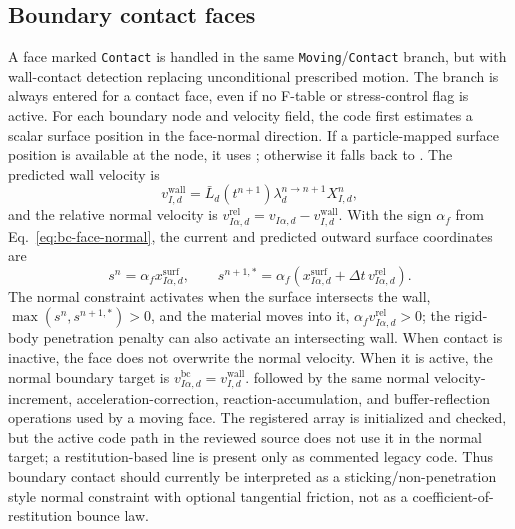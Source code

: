 \subsection{Boundary contact faces}
\label{subsec:bc-contact-wall}

A face marked \texttt{Contact} is handled in the same \texttt{Moving}/\texttt{Contact} branch, but with wall-contact detection replacing unconditional prescribed motion.  The branch is always entered for a contact face, even if no F-table or stress-control flag is active.  For each boundary node and velocity field, the code first estimates a scalar surface position in the face-normal direction.  If a particle-mapped surface position is available at the node, it uses ; otherwise it falls back to .  The predicted wall velocity is
\begin{equation}
  v_{I,d}^{\mathrm{wall}} = \bar L_d(t^{n+1})\lambda_d^{n\rightarrow n+1}X_{I,d}^{n},
  \label{eq:bc-wall-normal-target}
\end{equation}
and the relative normal velocity is $v_{I\alpha,d}^{\mathrm{rel}}=v_{I\alpha,d}-v_{I,d}^{\mathrm{wall}}$.  With the sign $\alpha_f$ from Eq.~\eqref{eq:bc-face-normal}, the current and predicted outward surface coordinates are
\begin{equation}
  s^n=\alpha_f x^{\mathrm{surf}}_{I\alpha,d},
  \qquad
  s^{n+1,*}=\alpha_f\left(x^{\mathrm{surf}}_{I\alpha,d}+\Delta t\,v_{I\alpha,d}^{\mathrm{rel}}\right).
\end{equation}
The normal constraint activates when the surface intersects the wall, $\max(s^n,s^{n+1,*})>0$, and the material moves into it, $\alpha_f v_{I\alpha,d}^{\mathrm{rel}}>0$; the rigid-body penetration penalty can also activate an intersecting wall.  When contact is inactive, the face does not overwrite the normal velocity.  When it is active, the normal boundary target is $v_{I\alpha,d}^{\mathrm{bc}}=v_{I,d}^{\mathrm{wall}}$.
followed by the same normal velocity-increment, acceleration-correction, reaction-accumulation, and buffer-reflection operations used by a moving face.  The registered  array is initialized and checked, but the active code path in the reviewed source does not use it in the normal target; a restitution-based line is present only as commented legacy code.  Thus boundary contact should currently be interpreted as a sticking/non-penetration style normal constraint with optional tangential friction, not as a coefficient-of-restitution bounce law.


